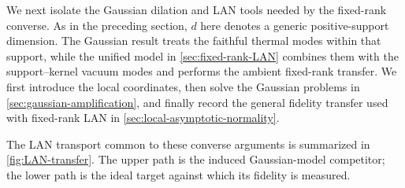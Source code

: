 \documentclass[11pt]{article}
\theoremstyle{remark}
\theoremstyle{plain}
\begin{document}
We next isolate the Gaussian dilation and LAN tools needed by the fixed-rank
converse.  As in the preceding section, \(d\) here denotes a generic
positive-support dimension.  The Gaussian result treats the faithful thermal
modes within that support, while the unified model in
\cref{sec:fixed-rank-LAN} combines them with the support--kernel vacuum modes
and performs the ambient fixed-rank transfer.  We first introduce the local
coordinates, then solve the Gaussian problems in
\cref{sec:gaussian-amplification}, and finally record the general fidelity
transfer used with fixed-rank LAN in \cref{sec:local-asymptotic-normality}.

The LAN transport common to these converse arguments is summarized in
\cref{fig:LAN-transfer}.  The upper path is the induced Gaussian-model
competitor; the lower path is the ideal target against which its fidelity is
measured.
\end{document}
